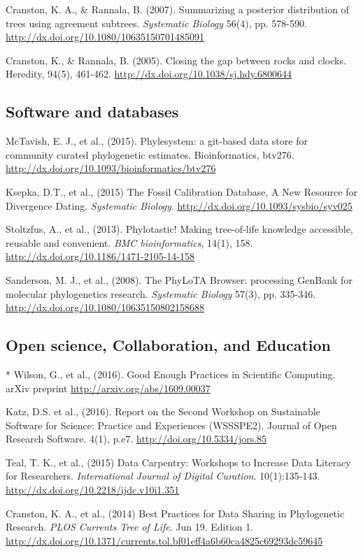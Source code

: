 \documentclass[10pt]{article}
\begin{document}
Cranston, K. A., \& Rannala, B. (2007). Summarizing a posterior distribution of trees using agreement subtrees. \textit{Systematic Biology} 56(4), pp. 578-590. \\
\url{http://dx.doi.org/10.1080/10635150701485091} 

Cranston, K., \& Rannala, B. (2005). Closing the gap between rocks and clocks. Heredity, 94(5), 461-462. \url{http://dx.doi.org/10.1038/sj.hdy.6800644}

\subsection*{Software and databases}
McTavish, E. J., et al., (2015). Phylesystem: a git-based data store for community curated phylogenetic estimates. Bioinformatics, btv276. \url{http://dx.doi.org/10.1093/bioinformatics/btv276} 

Ksepka, D.T., et al., (2015) The Fossil Calibration Database, A New Resource for Divergence Dating. \textit{Systematic Biology}. \url{http://dx.doi.org/10.1093/sysbio/syv025}

Stoltzfus, A., et al., (2013). Phylotastic! Making tree-of-life knowledge accessible, reusable and convenient. \textit{BMC bioinformatics}, 14(1), 158. \url{http://dx.doi.org/10.1186/1471-2105-14-158} 

Sanderson, M. J., et al., (2008). The PhyLoTA Browser: processing GenBank for molecular phylogenetics research. \textit{Systematic Biology} 57(3), pp. 335-346. \url{http://dx.doi.org/10.1080/10635150802158688} 

\subsection*{Open science, Collaboration, and Education}
* Wilson, G., et al., (2016). Good Enough Practices in Scientific Computing. arXiv preprint \url{http://arxiv.org/abs/1609.00037}

Katz, D.S. et al., (2016). Report on the Second Workshop on Sustainable Software for Science: Practice and Experiences (WSSSPE2). Journal of Open Research Software. 4(1), p.e7. \url{http://doi.org/10.5334/jors.85}

Teal, T. K., et al., (2015) Data Carpentry: Workshops to Increase Data Literacy for Researchers. \textit{International Journal of Digital Curation}. 10(1):135-143. \url{http://dx.doi.org/10.2218/ijdc.v10i1.351}
 
Cranston, K. A., et al., (2014) Best Practices for Data Sharing in Phylogenetic Research. \textit{PLOS Currents Tree of Life}. Jun 19. Edition 1. \\
\url{http://dx.doi.org/10.1371/currents.tol.bf01eff4a6b60ca4825c69293dc59645} 
\end{document}
